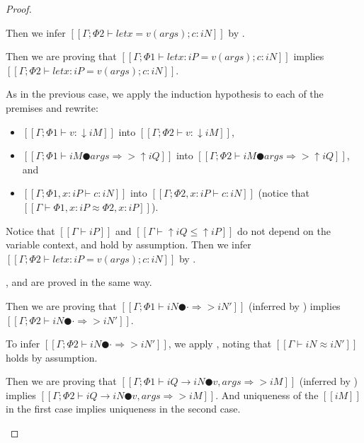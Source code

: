 \begin{proof}
\begin{caseof}
            Then we infer $[[Γ ; Φ2 ⊢ let x = v(args); c : iN]]$ by .

        \item {}
            Then we are proving that
            $[[Γ ; Φ1 ⊢ let x:iP = v(args); c : iN]]$ implies
            $[[Γ ; Φ2 ⊢ let x:iP = v(args); c : iN]]$.
        
            As in the previous case, we apply the induction hypothesis to each of the premises
            and rewrite:
            \begin{itemize}
                \item $[[Γ ; Φ1 ⊢ v : ↓iM]]$ into $[[Γ ; Φ2 ⊢ v : ↓iM]]$,
                \item $[[Γ ; Φ1 ⊢ iM ● args ⇒> ↑iQ]]$ into $[[Γ ; Φ2 ⊢ iM ● args ⇒> ↑iQ]]$, 
                    and
                \item $[[Γ ; Φ1, x:iP ⊢ c : iN]]$ into $[[Γ ; Φ2, x:iP ⊢ c : iN]]$
                (notice that $[[Γ ⊢ Φ1, x:iP ≈ Φ2, x:iP]]$).
            \end{itemize}
            
            Notice that $[[Γ ⊢ iP]]$ and $[[Γ ⊢ ↑iQ ≤ ↑iP]]$ 
            do not depend on the variable context, and hold by assumption.
            Then we infer $[[Γ ; Φ2 ⊢ let x:iP = v(args); c : iN]]$ by .

        \item {}, and 
            are proved in the same way.

        \item {}
            Then we are proving that 
            $[[Γ ; Φ1 ⊢ iN ● · ⇒> iN']]$ (inferred by )
            implies $[[Γ ; Φ2 ⊢ iN ● · ⇒> iN']]$.

            To infer $[[Γ ; Φ2 ⊢ iN ● · ⇒> iN']]$, 
            we apply , noting that 
            $[[Γ ⊢ iN ≈ iN']]$ holds by assumption.

        \item {}
            Then we are proving that 
            $[[Γ ; Φ1 ⊢ iQ → iN ● v, args ⇒> iM]]$ (inferred by )
            implies $[[Γ ; Φ2 ⊢ iQ → iN ● v, args ⇒> iM]]$.
            And uniqueness of the $[[iM]]$ in the first case implies uniqueness in the second case.


\end{caseof}
\end{proof}

